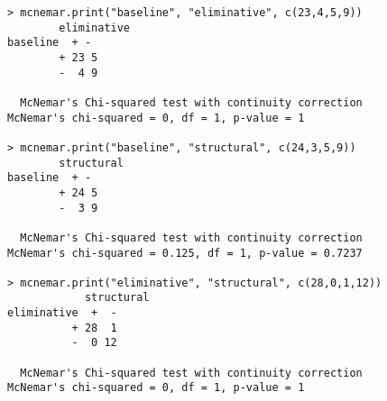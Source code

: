 \begin{mdframed}[backgroundcolor=black!5,hidealllines=true,innerleftmargin=0.2cm,innerrightmargin=0.2cm,innertopmargin=0.2cm,innerbottommargin=0.2cm]
\begin{verbatim}
> mcnemar.print("baseline", "eliminative", c(23,4,5,9))
        eliminative
baseline  + -
        + 23 5
        -  4 9

  McNemar's Chi-squared test with continuity correction
McNemar's chi-squared = 0, df = 1, p-value = 1

> mcnemar.print("baseline", "structural", c(24,3,5,9))
        structural
baseline  + -
        + 24 5
        -  3 9

  McNemar's Chi-squared test with continuity correction
McNemar's chi-squared = 0.125, df = 1, p-value = 0.7237

> mcnemar.print("eliminative", "structural", c(28,0,1,12))
            structural
eliminative  +  -
          + 28  1
          -  0 12

  McNemar's Chi-squared test with continuity correction
McNemar's chi-squared = 0, df = 1, p-value = 1
\end{verbatim}
\end{mdframed}
